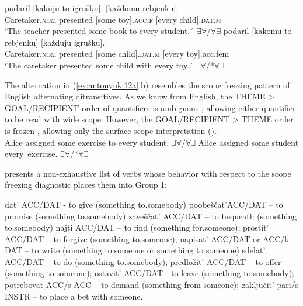 \documentclass[output=paper,colorlinks,citecolor=brown,nonflat]{./langscibook}
\begin{document}
\ea%
    \label{ex:antonyuk:12}
    \ea \label{ex:antonyuk:12a}
          {podaril}   {[kakuju-to} {igrušku].}       {[každomu} {rebjenku]}.\\
    Caretaker.\textsc{nom} presented   [some       toy].\textsc{acc.f} [every child].\textsc{dat.m}\\
    \glt `The teacher presented some book to every student.´ ${\exists}{\forall}$/${\forall}{\exists}$
    \ex \label{ex:antonyuk:12b}
           {podaril}   {[kakomu-to} {rebjenku]}    {[každuju} {igrušku]}.\\
    Caretaker.\textsc{nom}  presented   [some child].\textsc{dat.m} [every toy].acc.fem\\
    \glt `The caretaker presented some child with every toy.´ ${\exists}{\forall}$/*${\forall}{\exists}$
    \z
\z

The alternation in (\ref{ex:antonyuk:12a},b) resembles the scope freezing pattern of English alternating ditransitives. As we know from English, the THEME  >  GOAL/RECIPIENT order of quantifiers is ambiguous , allowing either quantifier to be read with wide scope. However, the GOAL/RECIPIENT > THEME order is frozen , allowing only the surface scope interpretation (\citealt{Larson1990, Bruening2001}).\\


\ea%
    \label{ex:antonyuk:13}
    \ea \label{ex:antonyuk:13a}
    Alice assigned some exercise to every student. \hfill ${\exists}{\forall}$/${\forall}{\exists}$
    \ex \label{ex:antonyuk:13b}
    Alice assigned some student every~exercise. \hfill ${\exists}{\forall}$/*${\forall}{\exists}$
    \z
\z

 presents a non-exhaustive list of verbs whose behavior with respect to the scope freezing diagnostic places them into Group 1:


\ea%
    \label{ex:antonyuk:14}
    \ea \label{ex:antonyuk:14a}
    dat’ ACC/DAT  {}- to give (something to.somebody)
    \ex \label{ex:antonyuk:14b}
    poobeščat’ACC/DAT – to promise (something to.somebody)
    \ex \label{ex:antonyuk:14c}
    zaveščat’ ACC/DAT – to bequeath (something to.somebody)
    \ex \label{ex:antonyuk:14d}
    najti ACC/DAT – to find (something for.someone);
    \ex \label{ex:antonyuk:14e}
    prostit’ ACC/DAT – to forgive (something to.someone);
    \ex \label{ex:antonyuk:14f}
    napisat’ ACC/DAT or ACC/k DAT – to write (something to.someone or something to someone)
    \ex \label{ex:antonyuk:14g}
    sdelat’ ACC/DAT – to do (something to.somebody);
    \ex \label{ex:antonyuk:14h}
    predložit’ ACC/DAT – to offer (something to.someone);
    \ex \label{ex:antonyuk:14i}
    ostavit’ ACC/DAT  {}- to leave (something to.somebody);
    \ex \label{ex:antonyuk:14j}
    potrebovat ACC/s ACC – to demand (something from someone);
    \ex \label{ex:antonyuk:14k}
    zaključit’ pari/s INSTR – to place a bet with someone.
    \z
\z
\end{document}
